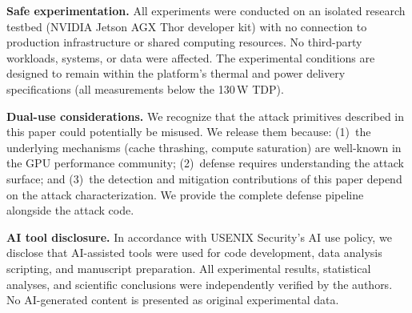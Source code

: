 \documentclass[letterpaper,twocolumn,10pt]{article}
\begin{document}
\textbf{Safe experimentation.}
All experiments were conducted on an isolated research testbed
(NVIDIA Jetson AGX Thor developer kit) with no connection to
production infrastructure or shared computing resources.  No
third-party workloads, systems, or data were affected.  The
experimental conditions are designed to remain within the
platform's thermal and power delivery specifications (all
measurements below the 130\,W TDP).

\textbf{Dual-use considerations.}
We recognize that the attack primitives described in this paper
could potentially be misused.  We release them because: (1)~the
underlying mechanisms (cache thrashing, compute saturation) are
well-known in the GPU performance community; (2)~defense requires
understanding the attack surface; and (3)~the detection and
mitigation contributions of this paper depend on the attack
characterization.  We provide the complete defense pipeline
alongside the attack code.

\textbf{AI tool disclosure.}
In accordance with USENIX Security's AI use policy, we disclose
that AI-assisted tools were used for code development, data analysis
scripting, and manuscript preparation.  All experimental results,
statistical analyses, and scientific conclusions were independently
verified by the authors.  No AI-generated content is presented as
original experimental data.
\end{document}
